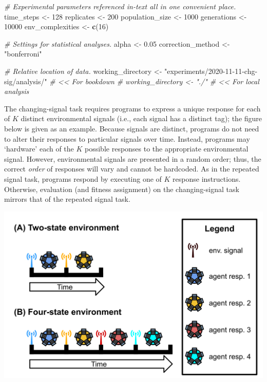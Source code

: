 \documentclass[
]{book}
\newenvironment{Shaded}{\begin{snugshade}}{\end{snugshade}}
\newcommand{\CommentTok}[1]{\textcolor[rgb]{0.56,0.35,0.01}{\textit{#1}}}
\newcommand{\DecValTok}[1]{\textcolor[rgb]{0.00,0.00,0.81}{#1}}
\newcommand{\FloatTok}[1]{\textcolor[rgb]{0.00,0.00,0.81}{#1}}
\newcommand{\KeywordTok}[1]{\textcolor[rgb]{0.13,0.29,0.53}{\textbf{#1}}}
\newcommand{\NormalTok}[1]{#1}
\newcommand{\StringTok}[1]{\textcolor[rgb]{0.31,0.60,0.02}{#1}}
\begin{document}
\begin{Shaded}
\begin{Highlighting}[]
\CommentTok{\# Experimental parameters referenced in{-}text all in one convenient place.}
\NormalTok{time\_steps \textless{}{-}}\StringTok{ }\DecValTok{128}
\NormalTok{replicates \textless{}{-}}\StringTok{ }\DecValTok{200}
\NormalTok{population\_size \textless{}{-}}\StringTok{ }\DecValTok{1000}
\NormalTok{generations \textless{}{-}}\StringTok{ }\DecValTok{10000}
\NormalTok{env\_complexities \textless{}{-}}\StringTok{ }\KeywordTok{c}\NormalTok{(}\DecValTok{16}\NormalTok{)}

\CommentTok{\# Settings for statistical analyses.}
\NormalTok{alpha \textless{}{-}}\StringTok{ }\FloatTok{0.05}
\NormalTok{correction\_method \textless{}{-}}\StringTok{ "bonferroni"}

\CommentTok{\# Relative location of data.}
\NormalTok{working\_directory \textless{}{-}}\StringTok{ "experiments/2020{-}11{-}11{-}chg{-}sig/analysis/"} \CommentTok{\# \textless{}\textless{} For bookdown}
\CommentTok{\# working\_directory \textless{}{-} "./"                                     \# \textless{}\textless{} For local analysis}
\end{Highlighting}
\end{Shaded}

The changing-signal task requires programs to express a unique response for each of \(K\) distinct environmental signals (i.e., each signal has a distinct tag); the figure below is given as an example.
Because signals are distinct, programs do not need to alter their responses to particular signals over time.
Instead, programs may `hardware' each of the \(K\) possible responses to the appropriate environmental signal.
However, environmental signals are presented in a random order; thus, the correct \emph{order} of responses will vary and cannot be hardcoded.
As in the repeated signal task, programs respond by executing one of \(K\) response instructions.
Otherwise, evaluation (and fitness assignment) on the changing-signal task mirrors that of the repeated signal task.

\includegraphics{experiments/2020-11-11-chg-sig/analysis/../../../media/changing-signal-task.png}
\end{document}
